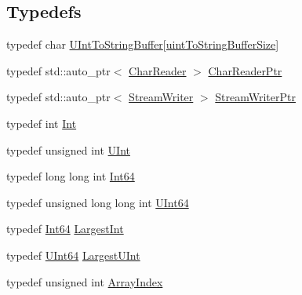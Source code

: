 \subsection*{Typedefs}
\begin{DoxyCompactItemize}
\item 
typedef char \hyperlink{namespaceJson_a602bcf69c2042fb61c3b243cb16f04ca}{U\+Int\+To\+String\+Buffer}\mbox{[}\hyperlink{namespaceJson_a0c5f614b019f20b4598dcaec09d9e820ae4f2008c7919f20d81286121d1374424}{uint\+To\+String\+Buffer\+Size}\mbox{]}
\item 
typedef std\+::auto\+\_\+ptr$<$ \hyperlink{classJson_1_1CharReader}{Char\+Reader} $>$ \hyperlink{namespaceJson_a4724efb8d41614b47036cb8b54233837}{Char\+Reader\+Ptr}
\item 
typedef std\+::auto\+\_\+ptr$<$ \hyperlink{classJson_1_1StreamWriter}{Stream\+Writer} $>$ \hyperlink{namespaceJson_a7132404aeebfc96d7c6ad2c66260afb5}{Stream\+Writer\+Ptr}
\item 
typedef int \hyperlink{namespaceJson_a08122e8005b706d982e48cca1e2119c7}{Int}
\item 
typedef unsigned int \hyperlink{namespaceJson_a800fb90eb6ee8d5d62b600c06f87f7d4}{U\+Int}
\item 
typedef long long int \hyperlink{namespaceJson_ab7b47d2905da3b4ae60e4e800ec9ae5f}{Int64}
\item 
typedef unsigned long long int \hyperlink{namespaceJson_a01f20bce8f8229f38ff890168c0e6452}{U\+Int64}
\item 
typedef \hyperlink{namespaceJson_ab7b47d2905da3b4ae60e4e800ec9ae5f}{Int64} \hyperlink{namespaceJson_a218d880af853ce786cd985e82571d297}{Largest\+Int}
\item 
typedef \hyperlink{namespaceJson_a01f20bce8f8229f38ff890168c0e6452}{U\+Int64} \hyperlink{namespaceJson_ae202ecad69725e23443f465e257456d0}{Largest\+U\+Int}
\item 
typedef unsigned int \hyperlink{namespaceJson_a8048e741f2177c3b5d9ede4a5b8c53c2}{Array\+Index}
\end{DoxyCompactItemize}
